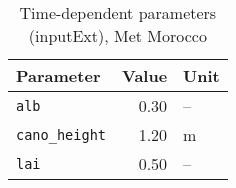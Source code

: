 \begin{table}[ht]
\centering
\caption{Time-dependent parameters (\textsf{inputExt}), Met Morocco} 
\label{tab:moroccoMet_inputExt}
\begin{tabular}{lrl}
  \hline
Parameter & Value & Unit \\ 
  \hline
\verb!alb! & 0.30 & -- \\ 
  \verb!cano_height! & 1.20 & m \\ 
  \verb!lai! & 0.50 & -- \\ 
   \hline
\end{tabular}
\end{table}
